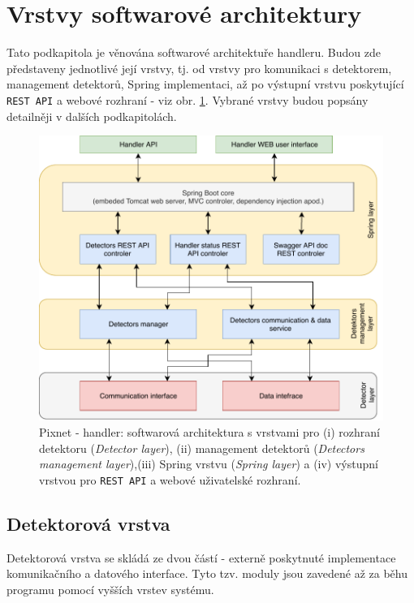 \section{Vrstvy softwarové architektury}\label{chap:handler:architecture}
Tato podkapitola je věnována softwarové architektuře handleru. Budou zde představeny jednotlivé její vrstvy, tj. od vrstvy pro komunikaci s detektorem, management detektorů, Spring implementaci, až po výstupní vrstvu poskytující \texttt{REST API} a webové rozhraní - viz obr. \ref{fig:handler:arch}. Vybrané vrstvy budou popsány detailněji v dalších podkapitolách.

\begin{figure}[th]
	\begin{center}
		\vspace*{0.4cm}
		\includegraphics[width=14cm]{figures/handler_architecture.pdf}
		\caption{Pixnet - handler: softwarová architektura s vrstvami pro (i) rozhraní detektoru (\textit{Detector layer}), (ii) management detektorů (\textit{Detectors management layer}),(iii) Spring vrstvu (\textit{Spring layer}) a (iv) výstupní vrstvou pro \texttt{REST API} a webové uživatelské rozhraní.}
		\label{fig:handler:arch}
	\end{center}
\end{figure}

\subsection{Detektorová vrstva}\label{chap:handler:detector_layer}
Detektorová vrstva se skládá ze dvou částí - externě poskytnuté implementace komunikačního a datového interface. Tyto tzv. moduly jsou zavedené až za běhu programu pomocí vyšších vrstev systému.

